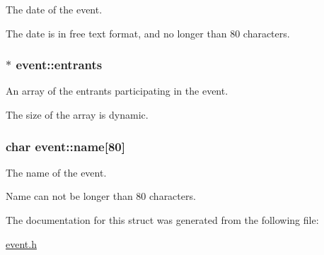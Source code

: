 The date of the event. 

The date is in free text format, and no longer than 80 characters. \hypertarget{structevent_aa1a228481826b11e4fb1e898c4cad46b}{
\subsubsection[{entrants}]{$\ast$ event\-::entrants}}\label{structevent_aa1a228481826b11e4fb1e898c4cad46b}


An array of the entrants participating in the event. 

The size of the array is dynamic. \hypertarget{structevent_a7c46e4f8536cfd63ebbdac5a258dc5dc}{
\subsubsection[{name}]{\setlength{\rightskip}{0pt plus 5cm}char event\-::name\mbox{[}80\mbox{]}}}\label{structevent_a7c46e4f8536cfd63ebbdac5a258dc5dc}


The name of the event. 

Name can not be longer than 80 characters. 

The documentation for this struct was generated from the following file\-:\begin{DoxyCompactItemize}
\item 
\hyperlink{event_8h}{event.\-h}\end{DoxyCompactItemize}
